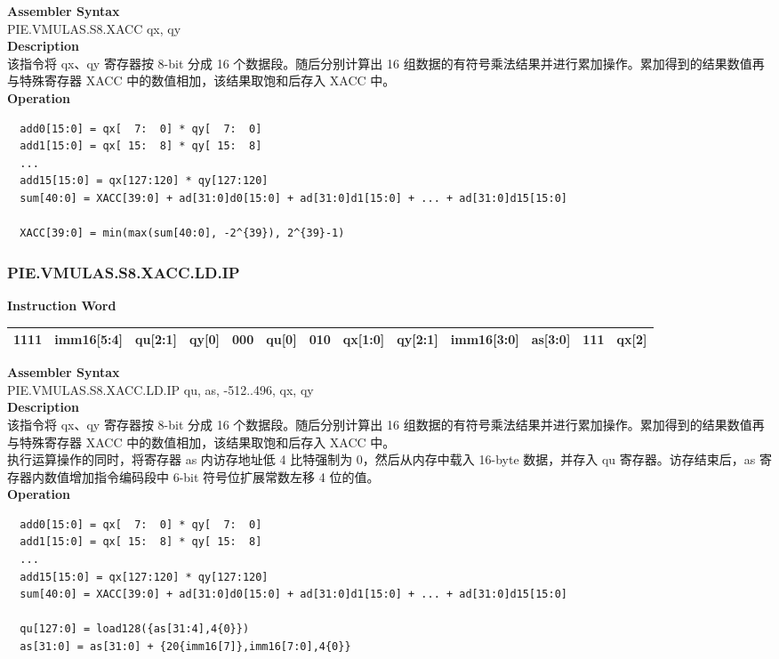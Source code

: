 \textbf{Assembler Syntax} \\
PIE.VMULAS.S8.XACC qx, qy \\
\textbf{Description} \\
该指令将 qx、qy 寄存器按 8-bit 分成 16 个数据段。随后分别计算出 16 组数据的有符号乘法结果并进行累加操作。累加得到的结果数值再与特殊寄存器 XACC 中的数值相加，该结果取饱和后存入 XACC 中。\\
\textbf{Operation}
\begin{lstlisting}
  add0[15:0] = qx[  7:  0] * qy[  7:  0]
  add1[15:0] = qx[ 15:  8] * qy[ 15:  8]
  ...
  add15[15:0] = qx[127:120] * qy[127:120]
  sum[40:0] = XACC[39:0] + ad[31:0]d0[15:0] + ad[31:0]d1[15:0] + ... + ad[31:0]d15[15:0]

  XACC[39:0] = min(max(sum[40:0], -2^{39}), 2^{39}-1)
\end{lstlisting}

\newpage
\subsubsection{PIE.VMULAS.S8.XACC.LD.IP}\label{instruction:PIEVMULASS8XACCLDIP}
\setlength\tabcolsep{6pt}
\textbf{Instruction Word} \\
\begin{tabular}{|c|c|c|c|c|c|c|c|c|c|c|c|c|}
	\hline
	1111 & imm16[5:4] & qu[2:1] & qy[0] & 000 & qu[0] & 010 & qx[1:0] & qy[2:1] & imm16[3:0] & as[3:0] & 111 & qx[2] \\
	\hline
\end{tabular}

\textbf{Assembler Syntax} \\
PIE.VMULAS.S8.XACC.LD.IP qu, as, -512..496, qx, qy \\
\textbf{Description} \\
该指令将 qx、qy 寄存器按 8-bit 分成 16 个数据段。随后分别计算出 16 组数据的有符号乘法结果并进行累加操作。累加得到的结果数值再与特殊寄存器 XACC 中的数值相加，该结果取饱和后存入 XACC 中。\\ 执行运算操作的同时，将寄存器 as 内访存地址低 4 比特强制为 0，然后从内存中载入 16-byte 数据，并存入 qu 寄存器。访存结束后，as 寄存器内数值增加指令编码段中 6-bit 符号位扩展常数左移 4 位的值。\\
\textbf{Operation}
\begin{lstlisting}
  add0[15:0] = qx[  7:  0] * qy[  7:  0]
  add1[15:0] = qx[ 15:  8] * qy[ 15:  8]
  ...
  add15[15:0] = qx[127:120] * qy[127:120]
  sum[40:0] = XACC[39:0] + ad[31:0]d0[15:0] + ad[31:0]d1[15:0] + ... + ad[31:0]d15[15:0]

  qu[127:0] = load128({as[31:4],4{0}})
  as[31:0] = as[31:0] + {20{imm16[7]},imm16[7:0],4{0}}
\end{lstlisting}

